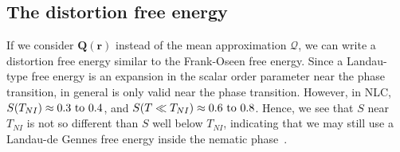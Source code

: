 \subsection{The distortion free energy}
If we consider $\mathbf{Q}(\mathbf{r})$ instead of the mean approximation $\bm{\mathcal{Q}}$, we can write a distortion free energy similar to the Frank-Oseen free energy.
Since a Landau-type free energy is an expansion in the scalar order parameter near the phase transition, in general is only valid near the phase transition.
However, in NLC, $S(T_{NI}) \approx 0.3 \textup{ to } 0.4$, and $S(T \ll T_{NI}) \approx 0.6 \textup{ to } 0.8$.
Hence, we see that $S$ near $T_{NI}$ is not so different than $S$ well below $T_{NI}$, indicating that we may still use a Landau-de Gennes free energy inside the nematic phase~\cite{RN198}.

